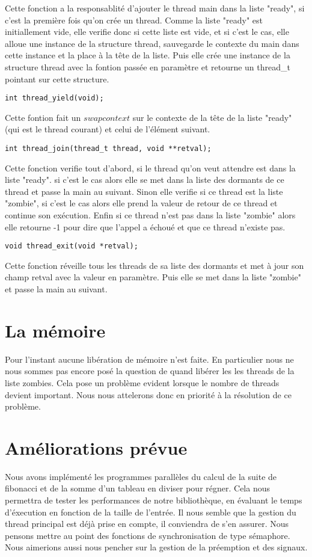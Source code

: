 \documentclass[12pt]{article}
\begin{document}
Cette fonction a la responsablité d'ajouter le thread main dans la
liste "ready", si c'est la première fois qu'on crée un thread.  Comme
la liste "ready" est initiallement vide, elle verifie donc si cette
liste est vide, et si c'est le cas, elle alloue une instance de la
structure thread, sauvegarde le contexte du main dans cette instance
et la place à la tête de la liste.  Puis elle crée une instance de la
structure thread avec la fontion passée en paramètre et retourne un
thread\_t pointant sur cette structure.  ~~\\
\begin{verbatim}
int thread_yield(void);
\end{verbatim}
Cette fontion fait un $swapcontext$ sur le contexte de la tête de 
la liste "ready" (qui est le thread courant) et celui de l'élément suivant.
~~\\
\begin{verbatim}
int thread_join(thread_t thread, void **retval);
\end{verbatim}
Cette fonction verifie tout d'abord, si le thread qu'on veut attendre
est dans la liste "ready". si c'est le cas alors elle se met dans la
liste des dormants de ce thread et passe la main au suivant.  Sinon
elle verifie si ce thread est la liste "zombie", si c'est le cas alors
elle prend la valeur de retour de ce thread et continue son exécution.
Enfin si ce thread n'est pas dans la liste "zombie" alors elle
retourne -1 pour dire que l'appel a échoué et que ce thread n'existe
pas.  ~~\\
\begin{verbatim}
void thread_exit(void *retval);
\end{verbatim}
Cette fonction réveille tous les threads de sa liste des dormants et
met à jour son champ retval avec la valeur en paramètre. Puis elle se
met dans la liste "zombie" et passe la main au suivant.

\section{La mémoire}
Pour l'instant aucune libération de mémoire n'est faite. En
particulier nous ne nous sommes pas encore posé la question de quand
libérer les les threads de la liste zombies. Cela pose un problème
evident lorsque le nombre de threads devient important. Nous nous
attelerons donc en priorité à la résolution de ce problème.

\section{Améliorations prévue}
Nous avons implémenté les programmes parallèles du calcul de la suite
de fibonacci et de la somme d'un tableau en diviser pour régner. Cela
nous permettra de tester les performances de notre bibliothèque, en
évaluant le temps d'éxecution en fonction de la taille de l'entrée.
Il nous semble que la gestion du thread principal est déjà prise en
compte, il conviendra de s'en assurer. Nous pensons mettre au point
des fonctions de synchronisation de type sémaphore. Nous aimerions
aussi nous pencher sur la gestion de la préemption et des signaux.
\end{document}
